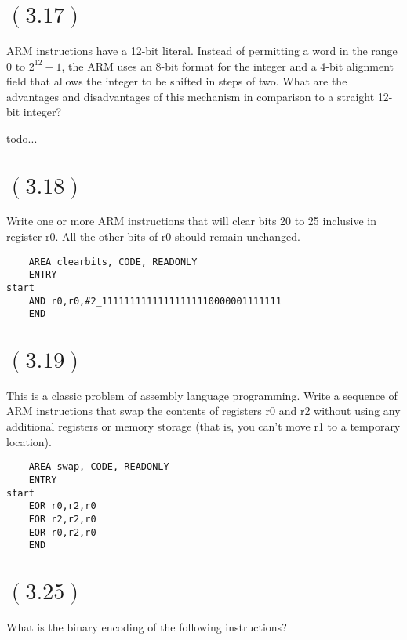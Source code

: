 \documentclass[letterpaper,12pt,titlepage]{article}
\begin{document}
\section*{$(3.17)$} ARM instructions have a 12-bit literal. Instead of permitting a word in the range 0 to $2^12 - 1$, the ARM uses an 8-bit format for the integer and a 4-bit alignment field that allows the integer to be shifted in steps of two. What are the advantages and disadvantages of this mechanism in comparison to a straight 12-bit integer? \newline

\begin{mdframed}[style=MyFrame]
todo...
\end{mdframed}

\section*{$(3.18)$} Write one or more ARM instructions that will clear bits 20 to 25 inclusive in register r0. All the other bits of r0 should remain unchanged.

\begin{lstlisting}
    AREA clearbits, CODE, READONLY 
    ENTRY
start
    AND r0,r0,#2_11111111111111111110000001111111
    END
\end{lstlisting}

\section*{$(3.19)$} This is a classic problem of assembly language programming. Write a sequence of ARM instructions that swap the contents of registers r0 and r2 without using any additional registers or memory storage (that is, you can't move r1 to a temporary location).

\begin{lstlisting}
    AREA swap, CODE, READONLY 
    ENTRY
start
    EOR r0,r2,r0
    EOR r2,r2,r0
    EOR r0,r2,r0    
    END
\end{lstlisting}

\section*{$(3.25)$} What is the binary encoding of the following instructions?
\end{document}
